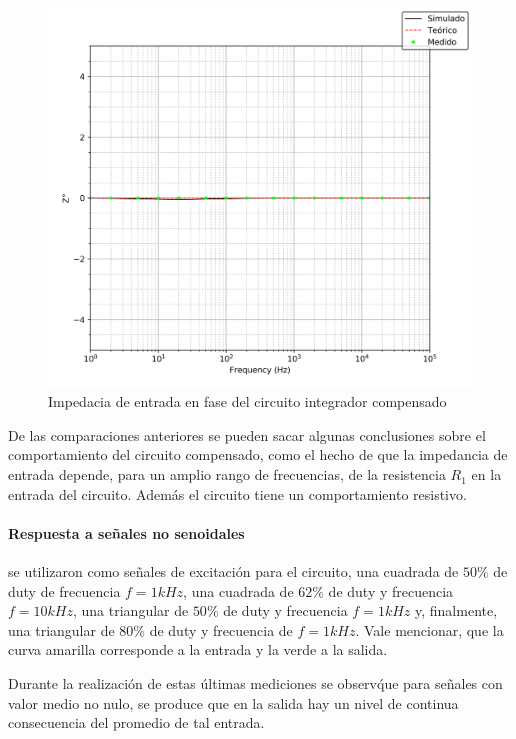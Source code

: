 \begin{figure}[H]
	\centering
	\includegraphics[scale=0.6]{Recursos/Integrador_compensado/impedancia_fase.png}
	\caption{Impedacia de entrada en fase del circuito integrador compensado}
	\label{fig:integrador_compensado_impedancia_fase}
\end{figure}

De las comparaciones anteriores se pueden sacar algunas conclusiones sobre el comportamiento del circuito compensado, como el hecho de que la impedancia
de entrada depende, para un amplio rango de frecuencias, de la resistencia $R_1$ en la entrada del circuito. Adem\'as el circuito tiene un comportamiento
resistivo.

\paragraph*{Respuesta a se\~nales no senoidales} se utilizaron como se\~nales de excitaci\'on para el circuito, una cuadrada de $50 \%$ de duty de frecuencia $f = 1kHz$, una
cuadrada de $62 \%$ de duty y frecuencia $f = 10kHz$, una triangular de $50 \%$ de duty y frecuencia $f = 1kHz$ y, finalmente, una triangular de $80 \%$ de duty y frecuencia de 
$f = 1kHz$. Vale mencionar, que la curva amarilla corresponde a la entrada y la verde a la salida.

Durante la realizaci\'on de estas \'ultimas mediciones se observ\' que para se\~nales con valor medio no nulo, se produce que en la salida
hay un nivel de continua consecuencia del promedio de tal entrada.

